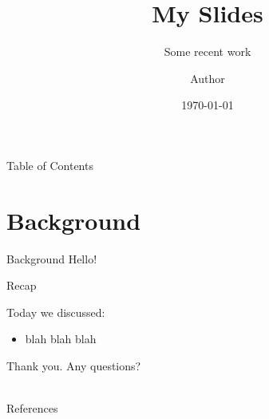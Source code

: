 \documentclass[10pt]{beamer}
\title{My Slides}
\subtitle{Some recent work}
\date{\today}
\author{Author}
\institute{Institute}
\makeatletter
\def\blfootnote{\gdef\@thefnmark{}\@footnotetext}
\makeatother
\begin{document}
\maketitle

\begin{frame}[fragile]{Table of Contents}
    \tableofcontents
\end{frame}

\section{Background}

\begin{frame}[fragile]{Background}
    Hello!
    \blfootnote{\citep{schmidhuber}}
\end{frame}

\begin{frame}[fragile]{Recap}

Today we discussed:

\begin{itemize}
    \item blah blah blah
\end{itemize}

Thank you. Any questions?\\~\\

\end{frame}

\begin{frame}[allowframebreaks]{References}
  
  
\end{frame}
\end{document}
